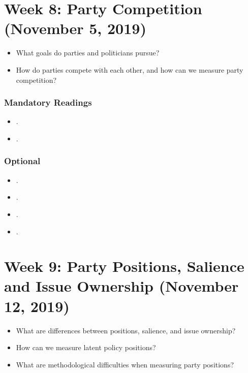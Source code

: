 \documentclass[abstract=on,parskip=full,headings=standardclasses,fontsize=11pt,paper=a4]{scrartcl}
\begin{document}
\section{Week 8: Party Competition (November 5, 2019)}

\begin{itemize}
\renewcommand\labelitemi{--}
\item What goals do parties and politicians pursue?
\item How do parties compete with each other, and how can we measure party competition?
\end{itemize}

\subsubsection*{Mandatory Readings}
\begin{itemize}
\item {}.
\item {}.
\end{itemize}

\subsubsection*{Optional}
\begin{itemize}
\item {}.
\item {}.
\item {}.
\item {}.
\end{itemize}


\section{Week 9:  Party Positions, Salience and Issue Ownership (November 12, 2019)}


\begin{itemize}
\renewcommand\labelitemi{--}
\item What are differences between positions, salience, and issue ownership?
\item How can we measure latent policy positions? 
\item What are methodological difficulties when measuring party positions?
\end{itemize}
\end{document}
